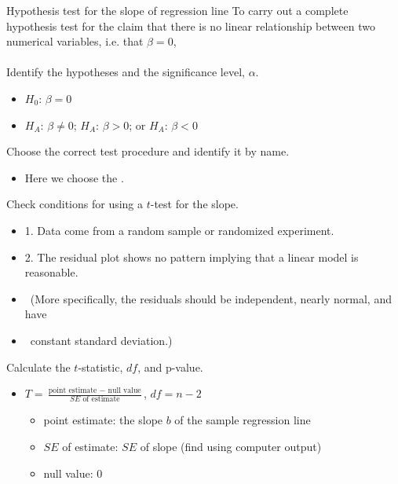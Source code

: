 
\begin{onebox}{Hypothesis test for the slope of regression line}
To carry out a complete hypothesis test for the claim that there is no linear relationship between two numerical variables, i.e. that $\beta=0$, 
\\
\\
 Identify the hypotheses and the significance level, $\alpha$.\vspace{-1mm}
\begin{itemize}
\setlength{\itemsep}{0mm}
\item[] $H_0$: $\beta = 0$  
\item[]  $H_A$: $\beta \ne 0$;  \quad $H_A$: $\beta > 0$; \quad or \quad $H_A$: $\beta < 0$ 
\end{itemize} 
 Choose the correct test procedure and identify it by name. \vspace{-1mm}
\begin{itemize}
\item[] Here we choose the . 
\end{itemize}
  Check conditions for using a $t$-test for the slope.\vspace{-1mm}
\begin{itemize}
\setlength{\itemsep}{0mm}
\item[] 1.  Data come from a random sample or randomized experiment.
\item[] 2.  The residual plot shows no pattern implying that a linear model is reasonable. \item[] \quad \ (More specifically, the residuals should be independent, nearly normal, and have  
\item [] \quad \  constant standard deviation.)
\end{itemize}
   Calculate the $t$-statistic, $df$, and p-value.
\begin{itemize}
\item[] $T= \frac{\text{point estimate } - \text{ null value}}{SE \text{ of estimate}}$, \quad $df=n-2$
\begin{itemize}
\item[] point estimate: the slope $b$ of the sample regression line
\item[] $SE$ of estimate:  $SE$ of slope (find using computer output)
\item[] null value: 0

\end{itemize}
\end{itemize}
\end{onebox}
